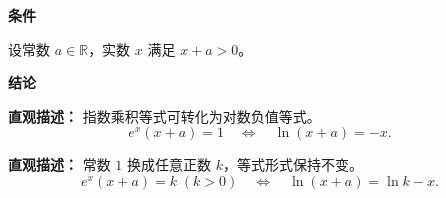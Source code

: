 \begin{statementbox}
	\textbf{\textcolor{CStatement}{条件}}
	\begin{description}[style=nextline,leftmargin=2.8em,labelsep=0.5em,itemsep=0.35em]
		\item[\textbf{\textcolor{CStatement}{条件 1（参数条件）：}}]
			设常数 $a\in\mathbb{R}$，实数 $x$ 满足 $x+a>0$。
	\end{description}
	\textbf{\textcolor{CStatement}{结论}}
	\begin{description}[style=nextline,leftmargin=2.8em,labelsep=0.5em,itemsep=0.45em]
		\item[\textbf{\textcolor{CStatement}{结论一（等价代换）：}}]
			\textbf{\textcolor{CStatement}{直观描述：}}
			指数乘积等式可转化为对数负值等式。
			\[
				e^{x}(x+a)=1 \quad\Longleftrightarrow\quad \ln(x+a)=-x.
			\]
		\item[\textbf{\textcolor{CStatement}{常见变形（参数化形式）：}}]
			\textbf{\textcolor{CStatement}{直观描述：}}
			常数 $1$ 换成任意正数 $k$，等式形式保持不变。
			\[
				e^{x}(x+a)=k\;(k>0) \quad\Longleftrightarrow\quad \ln(x+a)=\ln k - x.
			\]
	\end{description}

\end{statementbox}
